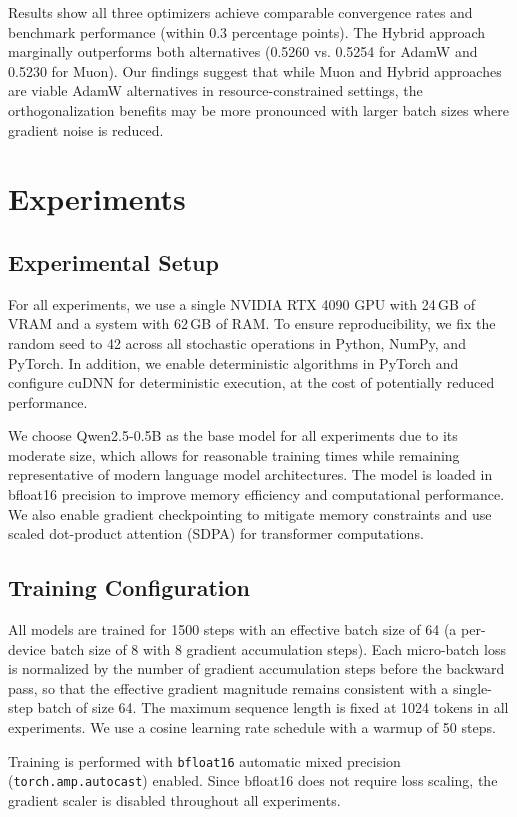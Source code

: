 \documentclass[11pt,a4paper]{article}
\begin{document}
Results show all three optimizers achieve comparable convergence rates and
benchmark performance (within 0.3 percentage points). The Hybrid approach
marginally outperforms both alternatives (0.5260 vs. 0.5254 for AdamW and 0.5230
for Muon). Our findings suggest that while Muon and Hybrid approaches are
viable AdamW alternatives in resource-constrained settings, the orthogonalization
benefits may be more pronounced with larger batch sizes where gradient noise
is reduced.


\section{Experiments}

\subsection{Experimental Setup}
For all experiments, we use a single NVIDIA RTX 4090 GPU with 24\,GB of VRAM
and a system with 62\,GB of RAM. To ensure reproducibility, we fix the random
seed to 42 across all stochastic operations in Python, NumPy, and PyTorch.
In addition, we enable deterministic algorithms in PyTorch and configure cuDNN
for deterministic execution, at the cost of potentially reduced performance.

We choose Qwen2.5-0.5B as the base model for all experiments due to its moderate
size, which allows for reasonable training times while remaining representative
of modern language model architectures. The model is loaded in bfloat16
precision to improve memory efficiency and computational performance. We also
enable gradient checkpointing to mitigate memory constraints and use scaled
dot-product attention (SDPA) for transformer computations.

\subsection{Training Configuration}
All models are trained for 1500 steps with an effective batch size of 64
(a per-device batch size of 8 with 8 gradient accumulation steps).
Each micro-batch loss is normalized by the number of gradient accumulation
steps before the backward pass, so that the effective gradient magnitude
remains consistent with a single-step batch of size 64.
The maximum sequence length is fixed at 1024 tokens in all experiments.
We use a cosine learning rate schedule with a warmup of 50 steps.

Training is performed with \texttt{bfloat16} automatic mixed precision
(\texttt{torch.amp.autocast}) enabled. Since bfloat16 does not require
loss scaling, the gradient scaler is disabled throughout all experiments.
\end{document}
